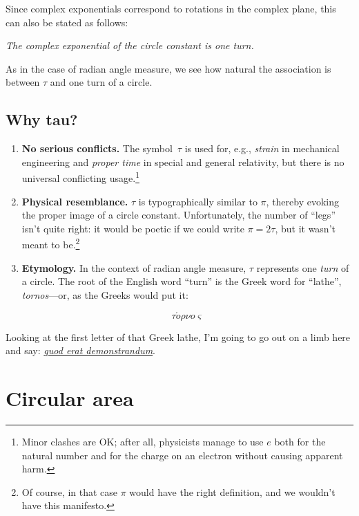 \documentclass{article}
\begin{document}
Since complex exponentials correspond to rotations in the complex plane, this can also be stated as follows:

\begin{center}
\emph{The complex exponential of the circle constant is one turn.}
\end{center}

\noindent As in the case of radian angle measure, we see how natural the association is between $\tau$ and one turn of a circle.


  \subsection{Why tau?} %
  \label{sec:why_tau}


\begin{enumerate}
  \item \textbf{No serious conflicts.} The symbol~$\tau$ is used for, e.g., \emph{strain} in mechanical engineering and \emph{proper time} in special and general relativity, but there is no universal conflicting usage.\footnote{Minor clashes are OK; after all, physicists manage to use $e$ both for the natural number and for the charge on an electron without causing apparent harm.} 
  
  \item \textbf{Physical resemblance.} $\tau$ is typographically similar to $\pi$, thereby evoking the proper image of a circle constant. Unfortunately, the number of ``legs'' isn't quite right: it would be poetic if we could write $\pi = 2\tau$, but it wasn't meant to be.\footnote{Of course, in that case $\pi$ would have the right definition, and we wouldn't have this manifesto.}
  
  \item \textbf{Etymology.} In the context of radian angle measure, $\tau$ represents one \emph{turn} of a circle. The root of the English word ``turn'' is the Greek word for ``lathe'', \emph{tornos}---or, as the Greeks would put it: 
  
\[ \tau \acute{o}\rho\nu o\varsigma \]
  
\end{enumerate}

\noindent Looking at the first letter of that Greek lathe, I'm going to go out on a limb here and say: \href{http://en.wikipedia.org/wiki/Q.E.D.}{\emph{quod erat demonstrandum}}.
  


\section{Circular area} %
\label{sec:circular_area}
\end{document}

